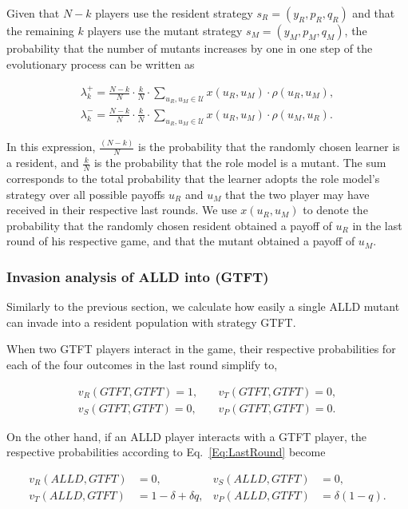 \documentclass[11pt]{article}
\theoremstyle{plainCl1}
\theoremstyle{plainCl2}
\begin{document}
Given that $N\!-\!k$ players use the resident strategy
$s_{R}\!=\!(y_{R},p_{R},q_{R})$ and that the remaining $k$ players use the
mutant strategy $s_{M}\!=\!(y_{M},p_{M},q_{M})$, the probability that the number
of mutants increases by one in one step of the evolutionary process can be
written as

\begin{align}
\lambda^+_k=\frac{N\!-\!k}{N}\cdot \frac{k}{N}\cdot \sum_{u_{R},u_{M}\in\mathcal{U}} x(u_{R},u_{M})\cdot \rho(u_{R},u_{M}), \\
\lambda^-_k=\frac{N\!-\!k}{N}\cdot \frac{k}{N}\cdot \sum_{u_{R},u_{M}\in\mathcal{U}} x(u_{R},u_{M})\cdot \rho(u_{M},u_{R}).
\end{align}

In this expression, $\frac{(N\!-\!k)}{N}$ is the probability that the randomly
chosen learner is a resident, and $\frac{k}{N}$ is the probability that the role
model is a mutant. The sum corresponds to the total probability that the learner
adopts the role model's strategy over all possible payoffs $u_R$ and $u_M$ that
the two player may have received in their respective last rounds. We use
$x(u_R,u_M)$ to denote the probability that the randomly chosen resident
obtained a payoff of $u_R$ in the last round of his respective game, and that
the mutant obtained a payoff of $u_M$.


\subsubsection{Invasion analysis of ALLD into (GTFT)}

Similarly to the previous section, we calculate how easily a single ALLD mutant
can invade into a resident population with strategy GTFT.

When two GTFT players interact in the game, their respective probabilities for
each of the four outcomes in the last round simplify to,

\begin{align*}
    v_R(GTFT,GTFT) = 1, & \quad v_T(GTFT,GTFT) = 0, \\
    v_S(GTFT,GTFT) = 0, & \quad v_P(GTFT,GTFT) = 0.
\end{align*}

On the other hand, if an ALLD player interacts with a GTFT player, the
respective probabilities according to Eq.~\ref{Eq:LastRound} become

\begin{align*}
    v_R(ALLD,GTFT) & = 0, &  v_S(ALLD,GTFT) & = 0, \\
    v_T (ALLD, GT F T ) & = 1 - \delta + \delta q, &  v_P (ALLD, GTFT) & = \delta(1 - q).
\end{align*}
\end{document}
